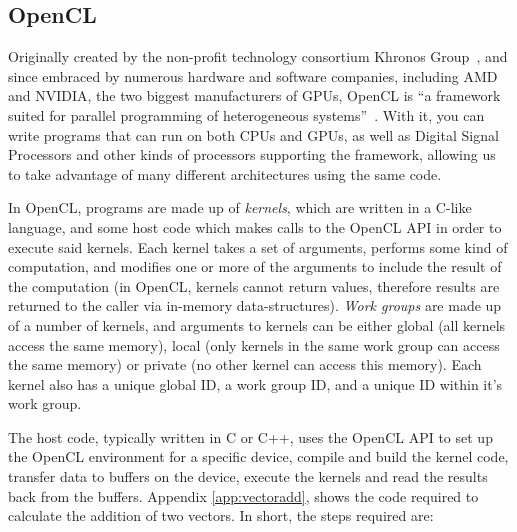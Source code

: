 \subsection{OpenCL}

Originally created by the non-profit technology consortium Khronos
Group~\cite{khronos}, and since embraced by numerous hardware and
software companies, including AMD and NVIDIA, the two biggest
manufacturers of GPUs, OpenCL\cite{opencl} is ``a framework suited for
parallel programming of heterogeneous
systems''~\cite[p.~35]{clbook}. With it, you can write programs that
can run on both CPUs and GPUs, as well as Digital Signal
Processors and other kinds of processors supporting the framework,
allowing us to take advantage of many different architectures using
the same code.

In OpenCL, programs are made up of \emph{kernels}, which are written
in a C-like language, and some host code which makes calls to the
OpenCL API in order to execute said kernels. Each kernel takes a set
of arguments, performs some kind of computation, and modifies one or
more of the arguments to include the result of the computation (in
OpenCL, kernels cannot return values, therefore results are returned
to the caller via in-memory data-structures). \emph{Work groups} are
made up of a number of kernels, and arguments to kernels can be either
global (all kernels access the same memory), local (only kernels in
the same work group can access the same memory) or private (no other
kernel can access this memory). Each kernel also has a unique global
ID, a work group ID, and a unique ID within it's work group.

The host code, typically written in C or C++, uses the
OpenCL API to set up the OpenCL environment for a specific device,
compile and build the kernel code, transfer data to buffers on the
device, execute the kernels and read the results back from the
buffers. Appendix \ref{app:vectoradd}, shows the code required to
calculate the addition of two vectors. In short, the steps required
are:

